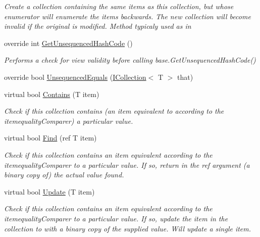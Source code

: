 \begin{DoxyCompactItemize}
\begin{DoxyCompactList}\small\item\em Create a collection containing the same items as this collection, but whose enumerator will enumerate the items backwards. The new collection will become invalid if the original is modified. Method typicaly used as in \end{DoxyCompactList}\item 
override int \hyperlink{class_c5_1_1_hashed_linked_list_afa9c20b419017663841ffd613d31e75b}{Get\+Unsequenced\+Hash\+Code} ()
\begin{DoxyCompactList}\small\item\em Performs a check for view validity before calling base.\+Get\+Unsequenced\+Hash\+Code() \end{DoxyCompactList}\item 
override bool \hyperlink{class_c5_1_1_hashed_linked_list_a658a0145c6f1d28e00e558a705d3c8e2}{Unsequenced\+Equals} (\hyperlink{interface_c5_1_1_i_collection}{I\+Collection}$<$ T $>$ that)
\item 
virtual bool \hyperlink{class_c5_1_1_hashed_linked_list_a210cb416cd7418c59c89b99e2fce7bf8}{Contains} (T item)
\begin{DoxyCompactList}\small\item\em Check if this collection contains (an item equivalent to according to the itemequality\+Comparer) a particular value. \end{DoxyCompactList}\item 
virtual bool \hyperlink{class_c5_1_1_hashed_linked_list_a71b0404288670bcd57700dafe8f9933c}{Find} (ref T item)
\begin{DoxyCompactList}\small\item\em Check if this collection contains an item equivalent according to the itemequality\+Comparer to a particular value. If so, return in the ref argument (a binary copy of) the actual value found. \end{DoxyCompactList}\item 
virtual bool \hyperlink{class_c5_1_1_hashed_linked_list_a1c0b09fb0b46cc0bcc00e67e5d027438}{Update} (T item)
\begin{DoxyCompactList}\small\item\em Check if this collection contains an item equivalent according to the itemequality\+Comparer to a particular value. If so, update the item in the collection to with a binary copy of the supplied value. Will update a single item. \end{DoxyCompactList}\item 

\end{DoxyCompactItemize}
